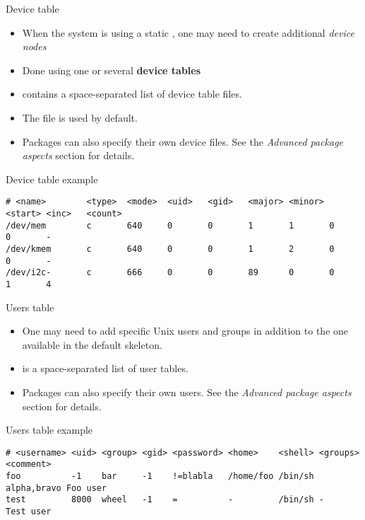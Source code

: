 \begin{frame}[fragile]{Device table}

  \begin{itemize}
  \item When the system is using a static , one may need to
    create additional {\em device nodes}
  \item Done using one or several {\bf device tables}
  \item {} contains a
    space-separated list of device table files.
  \item The  file is used by
    default.
  \item Packages can also specify their own device files. See the {\em
      Advanced package aspects} section for details.
  \end{itemize}

\begin{block}{Device table example}
{\tiny
\begin{verbatim}
# <name>        <type>  <mode>  <uid>   <gid>   <major> <minor> <start> <inc>   <count>
/dev/mem        c       640     0       0       1       1       0       0       -
/dev/kmem       c       640     0       0       1       2       0       0       -
/dev/i2c-       c       666     0       0       89      0       0       1       4
\end{verbatim}
}
\end{block}

\end{frame}

\begin{frame}[fragile]{Users table}
  \begin{itemize}
  \item One may need to add specific Unix users and groups in addition
    to the one available in the default skeleton.
  \item {} is a space-separated list of
    user tables.
  \item Packages can also specify their own users. See the {\em
      Advanced package aspects} section for details.
  \end{itemize}

\begin{block}{Users table example}
{\tiny
\begin{verbatim}
# <username> <uid> <group> <gid> <password> <home>    <shell> <groups>    <comment>
foo          -1    bar     -1    !=blabla   /home/foo /bin/sh alpha,bravo Foo user
test         8000  wheel   -1    =          -         /bin/sh -           Test user
\end{verbatim}
}
\end{block}

\end{frame}

